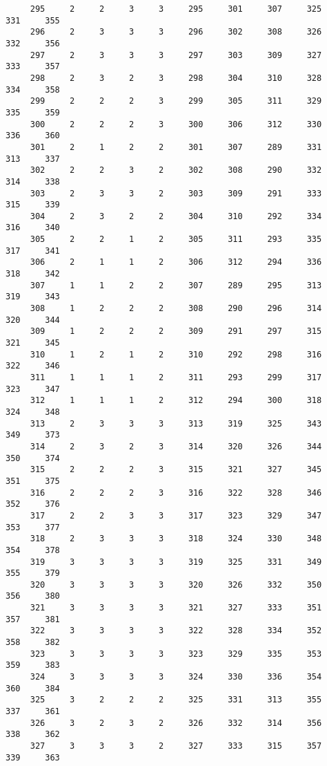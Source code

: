 \begin{verbatim}
     295     2     2     3     3     295     301     307     325     331     355
     296     2     3     3     3     296     302     308     326     332     356
     297     2     3     3     3     297     303     309     327     333     357
     298     2     3     2     3     298     304     310     328     334     358
     299     2     2     2     3     299     305     311     329     335     359
     300     2     2     2     3     300     306     312     330     336     360
     301     2     1     2     2     301     307     289     331     313     337
     302     2     2     3     2     302     308     290     332     314     338
     303     2     3     3     2     303     309     291     333     315     339
     304     2     3     2     2     304     310     292     334     316     340
     305     2     2     1     2     305     311     293     335     317     341
     306     2     1     1     2     306     312     294     336     318     342
     307     1     1     2     2     307     289     295     313     319     343
     308     1     2     2     2     308     290     296     314     320     344
     309     1     2     2     2     309     291     297     315     321     345
     310     1     2     1     2     310     292     298     316     322     346
     311     1     1     1     2     311     293     299     317     323     347
     312     1     1     1     2     312     294     300     318     324     348
     313     2     3     3     3     313     319     325     343     349     373
     314     2     3     2     3     314     320     326     344     350     374
     315     2     2     2     3     315     321     327     345     351     375
     316     2     2     2     3     316     322     328     346     352     376
     317     2     2     3     3     317     323     329     347     353     377
     318     2     3     3     3     318     324     330     348     354     378
     319     3     3     3     3     319     325     331     349     355     379
     320     3     3     3     3     320     326     332     350     356     380
     321     3     3     3     3     321     327     333     351     357     381
     322     3     3     3     3     322     328     334     352     358     382
     323     3     3     3     3     323     329     335     353     359     383
     324     3     3     3     3     324     330     336     354     360     384
     325     3     2     2     2     325     331     313     355     337     361
     326     3     2     3     2     326     332     314     356     338     362
     327     3     3     3     2     327     333     315     357     339     363

\end{verbatim}
